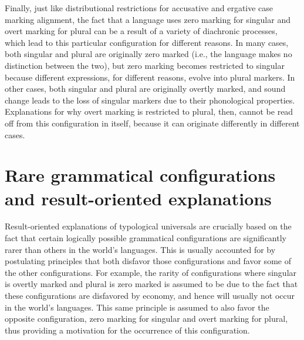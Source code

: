 \documentclass[output=paper]{langsci/langscibook}
\begin{document}
Finally, just like distributional restrictions for accusative and
ergative case marking alignment, the fact that a language uses zero marking for singular
and overt marking for plural can be a result of a variety of
diachronic processes,
 which lead to this particular configuration for different
reasons.  
In many cases, both singular and plural are originally zero
marked (i.e., the language makes no distinction between the two), but
zero marking becomes restricted to singular because different expressions, for different reasons, evolve into plural
markers.  In other cases, both
singular and plural are originally overtly marked, and sound change
leads to the loss of singular markers due to their phonological
properties. Explanations for why overt marking is restricted to plural, then,  cannot be read off from this configuration in itself,
because it can originate differently in different cases.


\section{Rare grammatical configurations and result-oriented explanations}\label{martin}

Result-oriented explanations of typological universals are crucially
 based on
the fact that certain logically possible grammatical configurations
are significantly rarer than
others in the world's languages. This is usually accounted for by
postulating  principles that both disfavor those configurations
and favor some of the other configurations. For
example, the rarity of configurations where singular is
overtly marked and plural is zero marked is assumed to be due to the
fact that these configurations are disfavored by economy, and hence
will usually not occur in  the world's languages. This same
principle is assumed to also favor the opposite configuration, zero marking for
singular and overt marking for plural, thus providing a motivation for
the occurrence of this configuration.
\end{document}
